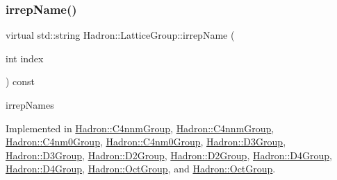 \mbox{\label{structHadron_1_1LatticeGroup_a4bc5620218c2a73157e19bc4451fe746}} 
\subsubsection{\texorpdfstring{irrepName()}{irrepName()}\hspace{0.1cm}{\footnotesize\ttfamily [1/2]}}
{\footnotesize\ttfamily virtual std\+::string Hadron\+::\+Lattice\+Group\+::irrep\+Name (\begin{DoxyParamCaption}\item[{int}]{index }\end{DoxyParamCaption}) const\hspace{0.3cm}{\ttfamily [pure virtual]}}

irrep\+Names 

Implemented in \mbox{\hyperlink{structHadron_1_1C4nnmGroup_ac2b3ee6989ddbd93bc63c46ac9626997}{Hadron\+::\+C4nnm\+Group}}, \mbox{\hyperlink{structHadron_1_1C4nnmGroup_ac2b3ee6989ddbd93bc63c46ac9626997}{Hadron\+::\+C4nnm\+Group}}, \mbox{\hyperlink{structHadron_1_1C4nm0Group_ae7e7c420d17cacaed69a74902af72dcc}{Hadron\+::\+C4nm0\+Group}}, \mbox{\hyperlink{structHadron_1_1C4nm0Group_ae7e7c420d17cacaed69a74902af72dcc}{Hadron\+::\+C4nm0\+Group}}, \mbox{\hyperlink{structHadron_1_1D3Group_a3e60ca3001ddc0176179107cfed2d621}{Hadron\+::\+D3\+Group}}, \mbox{\hyperlink{structHadron_1_1D3Group_a3e60ca3001ddc0176179107cfed2d621}{Hadron\+::\+D3\+Group}}, \mbox{\hyperlink{structHadron_1_1D2Group_a502111e32a238c50b248b9f7b0625385}{Hadron\+::\+D2\+Group}}, \mbox{\hyperlink{structHadron_1_1D2Group_a502111e32a238c50b248b9f7b0625385}{Hadron\+::\+D2\+Group}}, \mbox{\hyperlink{structHadron_1_1D4Group_a5f121bd08a7add3ddf660c7e3478cb9e}{Hadron\+::\+D4\+Group}}, \mbox{\hyperlink{structHadron_1_1D4Group_a5f121bd08a7add3ddf660c7e3478cb9e}{Hadron\+::\+D4\+Group}}, \mbox{\hyperlink{structHadron_1_1OctGroup_a58f84ff32d1dce2277f3b9da9d35d594}{Hadron\+::\+Oct\+Group}}, and \mbox{\hyperlink{structHadron_1_1OctGroup_a58f84ff32d1dce2277f3b9da9d35d594}{Hadron\+::\+Oct\+Group}}.

